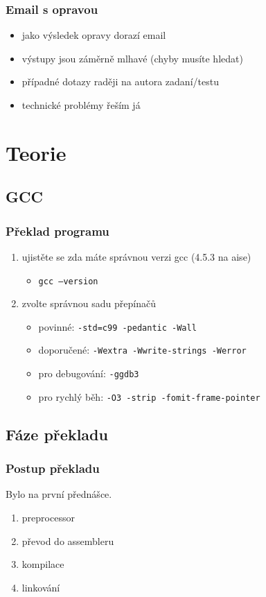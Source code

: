 \begin{frame}
	\frametitle{Email s opravou}
	\begin{itemize}
		\item{jako výsledek opravy dorazí email}
		\item{výstupy jsou záměrně mlhavé (chyby musíte hledat)}
		\item{případné dotazy raději na autora zadaní/testu}
		\item{technické problémy řeším já}
	\end{itemize}
\end{frame}


\section{Teorie}
\subsection{GCC}

\begin{frame}
	\frametitle{Překlad programu}
	\begin{enumerate}
	\item{ujistěte se zda máte správnou verzi gcc (4.5.3 na aise)}
		\begin{itemize}
			\item{\texttt{gcc --version}}
		\end{itemize}
	\item{zvolte správnou sadu přepínačů}
		\begin{itemize}
			\item{\alert{povinné:} \texttt{-std=c99 -pedantic -Wall}}
			\item{\alert{doporučené:} \texttt{-Wextra -Wwrite-strings -Werror}}
			\item{pro debugování: \texttt{-ggdb3}}
			\item{pro rychlý běh: \texttt{-O3 -strip -fomit-frame-pointer}}
		\end{itemize}
	\end{enumerate}
\end{frame}

\subsection{Fáze překladu}

\begin{frame}
	\frametitle{Postup překladu}
	Bylo na první přednášce.
	\begin{enumerate}
		\item{preprocessor}
		\item{převod do assembleru}
		\item{kompilace}
		\item{linkování}
	\end{enumerate}
\end{frame}

